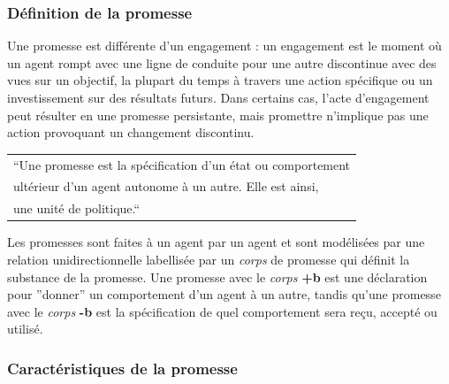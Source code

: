 
\subsubsection{Définition de la promesse}

Une promesse est différente d'un engagement : un engagement est le moment où un
agent rompt avec une ligne de conduite pour une autre discontinue avec des vues
sur un objectif, la plupart du temps à travers une action spécifique ou un
investissement sur des résultats futurs. Dans certains cas, l'acte
d'engagement peut résulter en une promesse persistante, mais promettre
n'implique pas une action provoquant un changement discontinu.

{%
    \centering
    \begin{tabular}{l}
        ``Une promesse est la spécification d'un état ou comportement \\
        ultérieur d'un agent autonome à un autre. Elle est ainsi, \\
        une unité de politique.`` \cite{burgess_modeling_2006} \\
    \end{tabular}
\par}%

Les promesses sont faites à un agent par un agent et sont modélisées par une
relation unidirectionnelle labellisée par un \emph{corps} de promesse qui
définit la substance de la promesse. Une promesse avec le \emph{corps}
\textbf{+b} est une déclaration pour ''donner'' un comportement d'un agent à un
autre, tandis qu'une promesse avec le \emph{corps} \textbf{-b} est la
spécification de quel comportement sera reçu, accepté ou utilisé.

\subsubsection{Caractéristiques de la promesse}

